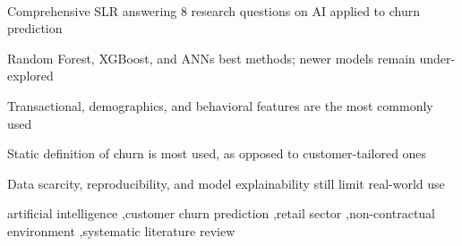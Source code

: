 \documentclass[preprint,12pt]{elsarticle}
\begin{document}
\begin{frontmatter}
\begin{abstract}




\end{abstract}



\

\begin{highlights}
\item Comprehensive SLR answering 8 research questions on AI applied to churn prediction
\item Random Forest, XGBoost, and ANNs best methods; newer models remain under-explored
\item Transactional, demographics, and behavioral features are the most commonly used
\item Static definition of churn is most used, as opposed to customer-tailored ones
\item Data scarcity, reproducibility, and model explainability still limit real-world use 
\end{highlights}

\begin{keyword}
artificial intelligence \sep customer churn prediction \sep retail sector \sep non-contractual environment \sep systematic literature review  
\end{keyword}

\end{frontmatter}
\end{document}
